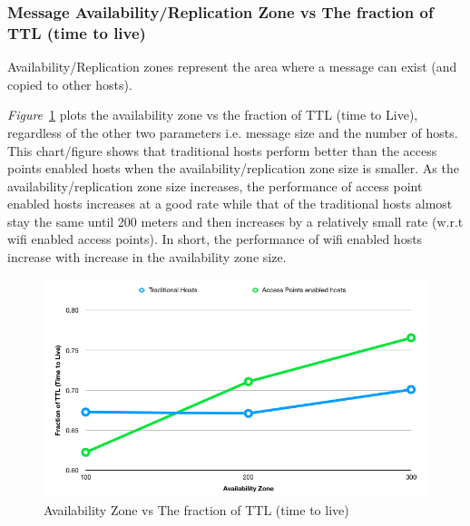 \subsubsection{Message Availability/Replication Zone vs The fraction of TTL (time to live)}
Availability/Replication zones represent the area where a message can exist (and copied to other hosts). {\emph{Figure}~\ref{fig:scenario1_availability_zone} plots the availability zone vs the fraction of TTL (time to Live), regardless of the other two parameters i.e. message size and the number of hosts. This chart/figure shows that traditional hosts perform better than the access points enabled hosts when the availability/replication zone size is smaller. As the availability/replication zone size increases, the performance of access point enabled hosts increases at a good rate while that of the traditional hosts almost stay the same until 200 meters and then increases by a relatively small rate (w.r.t wifi enabled access points). In short, the performance of wifi enabled hosts increase with increase in the availability zone size.
\begin{figure}[h]
  \centering
  \includegraphics[scale=0.5]{./figures/scenario1_availability_zone}
  \caption{Availability Zone vs The fraction of TTL (time to live)}
  \label{fig:scenario1_availability_zone}
\end{figure}

}
